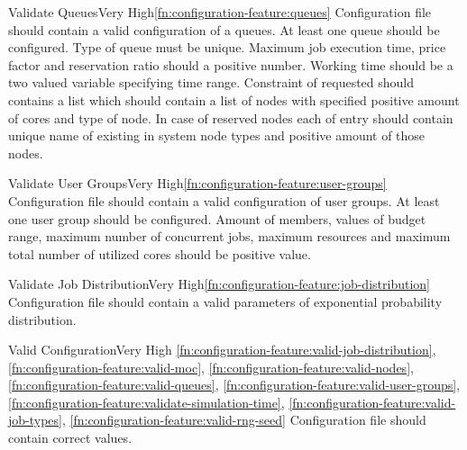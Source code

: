 	\begin{functional}{Validate Queues}{Very High}{\ref{fn:configuration-feature:queues}}
		\label{fn:configuration-feature:valid-queues}
		{
			Configuration file should contain a valid configuration of a queues. At least one queue should be configured.
			Type of queue must be unique. Maximum job execution time, price factor and reservation ratio should a positive number.
			Working time should be a two valued variable specifying time range. Constraint of requested should contains a list which should contain a list of nodes with specified positive amount of cores and type of node. In case of reserved nodes each of entry should contain unique name of existing in system node types and positive amount of those nodes.
		}
	\end{functional}

	\begin{functional}{Validate User Groups}{Very High}{\ref{fn:configuration-feature:user-groups}}
		\label{fn:configuration-feature:valid-user-groups}
		{
			Configuration file should contain a valid configuration of user groups. At least one user group should be configured. Amount of members, values of budget range, maximum number of concurrent jobs, maximum resources and maximum total number of utilized cores should be positive value.
		}
	\end{functional}

	\begin{functional}{Validate Job Distribution}{Very High}{\ref{fn:configuration-feature:job-distribution}}
		\label{fn:configuration-feature:valid-job-distribution}
		{
			Configuration file should contain a valid parameters of exponential probability distribution.	
		}
	\end{functional}

	\begin{functional}{Valid Configuration}{Very High}
		{
			\ref{fn:configuration-feature:valid-job-distribution},
			\ref{fn:configuration-feature:valid-moc},
			\ref{fn:configuration-feature:valid-nodes},
			\ref{fn:configuration-feature:valid-queues},
			\ref{fn:configuration-feature:valid-user-groups},
			\ref{fn:configuration-feature:validate-simulation-time},
			\ref{fn:configuration-feature:valid-job-types},
			\ref{fn:configuration-feature:valid-rng-seed}
		}
		\label{fn:configuration-feature:valid-configuration}
		{
			Configuration file should contain correct values.
		}
	\end{functional}
	